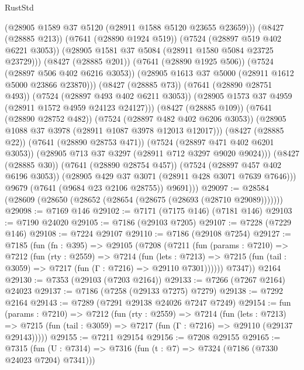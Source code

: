 \begin{lexlean}{RustStd}
\begin{coremodule}
{\begin{coremodule}
{{{{{{{{{{{{{{{{{{{{{{{{{{{{{{{{                        (@28905 @1589 @37 @5120 (@28911 @1588 @5120 @23655 @23659)))
                      (@8427 (@28885 @213))
                      (@7641 (@28890 @1924 @519))
                      (@7524 (@28897 @519 @402 @6221 @3053))
                      (@28905 @1581 @37 @5084 (@28911 @1580 @5084 @23725 @23729)))
                    (@8427 (@28885 @201))
                    (@7641 (@28890 @1925 @506))
                    (@7524 (@28897 @506 @402 @6216 @3053))
                    (@28905 @1613 @37 @5000 (@28911 @1612 @5000 @23866 @23870)))
                  (@8427 (@28885 @73))
                  (@7641 (@28890 @28751 @493))
                  (@7524 (@28897 @493 @402 @6211 @3053))
                  (@28905 @1573 @37 @4959 (@28911 @1572 @4959 @24123 @24127)))
                (@8427 (@28885 @109))
                (@7641 (@28890 @28752 @482))
                (@7524 (@28897 @482 @402 @6206 @3053))
                (@28905 @1088 @37 @3978 (@28911 @1087 @3978 @12013 @12017)))
              (@8427 (@28885 @22))
              (@7641 (@28890 @28753 @471))
              (@7524 (@28897 @471 @402 @6201 @3053))
              (@28905 @713 @37 @3297 (@28911 @712 @3297 @9020 @9024)))
            (@8427 (@28885 @30))
            (@7641 (@28890 @28754 @457))
            (@7524 (@28897 @457 @402 @6196 @3053))
            (@28905 @429 @37 @3071 (@28911 @428 @3071 @7639 @7646)))
          @9679
          (@7641 (@9684 @23 @2106 @28755))
          @9691)))
@29097 := @28584 (@28609 (@28650 (@28652 (@28654 (@28675 (@28693 (@28710 @29089)))))))
@29098 := @7169 @146
@29102 := @7171 (@7175 @146) (@7181 @146)
@29103 := @7190 @24020
@29105 := @7186 (@29103 @7205)
@29107 := @7228 (@7229 @146)
@29108 := @7224 @29107
@29110 := @7186 (@29108 @7254)
@29127 := @7185
    (fun (fn : @395) =>
    @29105
      (@7208
        (@7211
          (fun (params : @7210) =>
          @7212
            (fun (rty : @2559) =>
            @7214
              (fun (lets : @7213) =>
              @7215 (fun (tail : @3059) => @7217 (fun (Γ : @7216) => @29110 @7301))))))
        @7347))
    @2164
@29130 := @7353 (@29103 (@7203 @2164))
@29133 := @7266 (@7267 @2164) @24023
@29137 := @7186 (@7258 (@29133 @7275) @7279)
@29138 := @7292 @2164
@29143 := @7289 (@7291 @29138 @24026 @7247 @7249)
@29154 := fun (params : @7210) =>
  @7212
    (fun (rty : @2559) =>
    @7214
      (fun (lets : @7213) =>
      @7215 (fun (tail : @3059) => @7217 (fun (Γ : @7216) => @29110 (@29137 @29143)))))
@29155 := @7211 @29154
@29156 := @7208 @29155
@29165 := @7315
    (fun (U : @7314) => @7316 (fun (t : @7) => @7324 (@7186 (@7330 @24023 @7204) @7341)))
}}}}}}}}}}}}}}}}}}}}}}}}}}}}}}}}
\end{coremodule}}
\end{coremodule}
\end{lexlean}
